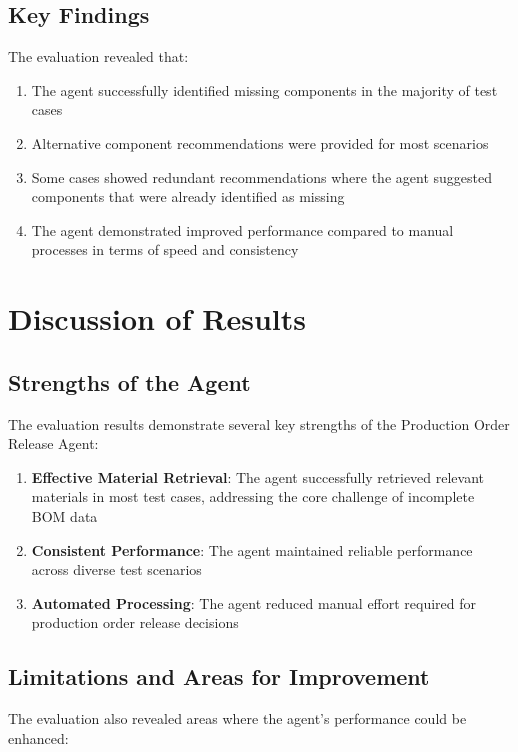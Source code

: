 \subsection{Key Findings}

The evaluation revealed that:

\begin{enumerate}
    \item The agent successfully identified missing components in the majority of test cases
    \item Alternative component recommendations were provided for most scenarios
    \item Some cases showed redundant recommendations where the agent suggested components that were already identified as missing
    \item The agent demonstrated improved performance compared to manual processes in terms of speed and consistency
\end{enumerate}

\section{Discussion of Results}

\subsection{Strengths of the Agent}

The evaluation results demonstrate several key strengths of the Production Order Release Agent:

\begin{enumerate}
    \item \textbf{Effective Material Retrieval}: The agent successfully retrieved relevant materials in most test cases, addressing the core challenge of incomplete BOM data
    \item \textbf{Consistent Performance}: The agent maintained reliable performance across diverse test scenarios
    \item \textbf{Automated Processing}: The agent reduced manual effort required for production order release decisions
\end{enumerate}

\subsection{Limitations and Areas for Improvement}

The evaluation also revealed areas where the agent's performance could be enhanced:

